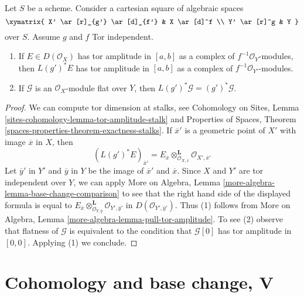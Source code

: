 \begin{lemma}
\label{lemma-tor-independence-and-tor-amplitude}
Let $S$ be a scheme. Consider a cartesian square of algebraic spaces
$$
\xymatrix{
X' \ar[r]_{g'} \ar[d]_{f'} & X \ar[d]^f \\
Y' \ar[r]^g & Y
}
$$
over $S$. Assume $g$ and $f$ Tor independent.
\begin{enumerate}
\item If $E \in D(\mathcal{O}_X)$ has tor amplitude
in $[a, b]$ as a complex of $f^{-1}\mathcal{O}_Y$-modules,
then $L(g')^*E$ has tor amplitude
in $[a, b]$ as a complex of $f^{-1}\mathcal{O}_{Y'}$-modules.
\item If $\mathcal{G}$ is an $\mathcal{O}_X$-module flat
over $Y$, then $L(g')^*\mathcal{G} = (g')^*\mathcal{G}$.
\end{enumerate}
\end{lemma}

\begin{proof}
We can compute tor dimension at stalks, see
Cohomology on Sites, Lemma \ref{sites-cohomology-lemma-tor-amplitude-stalk}
and Properties of Spaces, Theorem
\ref{spaces-properties-theorem-exactness-stalks}.
If $\overline{x}'$ is a geometric point of $X'$ with image
$\overline{x}$ in $X$, then
$$
(L(g')^*E)_{\overline{x}'} =
E_{\overline{x}}
\otimes_{\mathcal{O}_{X, \overline{x}}}^\mathbf{L}
\mathcal{O}_{X', \overline{x}'}
$$
Let $\overline{y}'$ in $Y'$ and $\overline{y}$ in $Y$
be the image of $\overline{x}'$ and $\overline{x}$.
Since $X$ and $Y'$ are tor independent over $Y$, we can apply
More on Algebra, Lemma \ref{more-algebra-lemma-base-change-comparison}
to see that the right hand side of the displayed formula is equal to
$E_{\overline{x}}
\otimes_{\mathcal{O}_{Y, \overline{y}}}^\mathbf{L}
\mathcal{O}_{Y', \overline{y}'}$
in $D(\mathcal{O}_{Y', \overline{y}'})$.
Thus (1) follows from
More on Algebra, Lemma \ref{more-algebra-lemma-pull-tor-amplitude}.
To see (2) observe that flatness of $\mathcal{G}$ is equivalent to
the condition that $\mathcal{G}[0]$ has tor amplitude in $[0, 0]$.
Applying (1) we conclude.
\end{proof}










\section{Cohomology and base change, V}
\label{section-cohomology-base-change}


